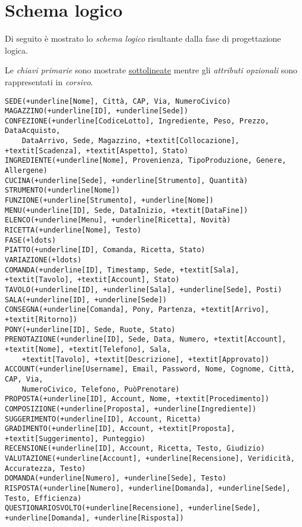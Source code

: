 \section{Schema logico}
Di seguito è mostrato lo {\it schema logico} risultante dalla fase di progettazione logica.

Le {\it chiavi primarie} sono mostrate \underline{sottolineate} mentre gli {\it attributi opzionali}
sono rappresentati in \textit{corsivo}.

\begin{Verbatim}[commandchars=+\[\]]
SEDE(+underline[Nome], Città, CAP, Via, NumeroCivico)
MAGAZZINO(+underline[ID], +underline[Sede])
CONFEZIONE(+underline[CodiceLotto], Ingrediente, Peso, Prezzo, DataAcquisto,
    DataArrivo, Sede, Magazzino, +textit[Collocazione], +textit[Scadenza], +textit[Aspetto], Stato)
INGREDIENTE(+underline[Nome], Provenienza, TipoProduzione, Genere, Allergene)
CUCINA(+underline[Sede], +underline[Strumento], Quantità)
STRUMENTO(+underline[Nome])
FUNZIONE(+underline[Strumento], +underline[Nome])
MENU(+underline[ID], Sede, DataInizio, +textit[DataFine])
ELENCO(+underline[Menu], +underline[Ricetta], Novità)
RICETTA(+underline[Nome], Testo)
FASE(+ldots)
PIATTO(+underline[ID], Comanda, Ricetta, Stato)
VARIAZIONE(+ldots)
COMANDA(+underline[ID], Timestamp, Sede, +textit[Sala], +textit[Tavolo], +textit[Account], Stato)
TAVOLO(+underline[ID], +underline[Sala], +underline[Sede], Posti)
SALA(+underline[ID], +underline[Sede])
CONSEGNA(+underline[Comanda], Pony, Partenza, +textit[Arrivo], +textit[Ritorno])
PONY(+underline[ID], Sede, Ruote, Stato)
PRENOTAZIONE(+underline[ID], Sede, Data, Numero, +textit[Account], +textit[Nome], +textit[Telefono], Sala,
    +textit[Tavolo], +textit[Descrizione], +textit[Approvato])
ACCOUNT(+underline[Username], Email, Password, Nome, Cognome, Città, CAP, Via,
    NumeroCivico, Telefono, PuòPrenotare)
PROPOSTA(+underline[ID], Account, Nome, +textit[Procedimento])
COMPOSIZIONE(+underline[Proposta], +underline[Ingrediente])
SUGGERIMENTO(+underline[ID], Account, Ricetta)
GRADIMENTO(+underline[ID], Account, +textit[Proposta], +textit[Suggerimento], Punteggio)
RECENSIONE(+underline[ID], Account, Ricetta, Testo, Giudizio)
VALUTAZIONE(+underline[Account], +underline[Recensione], Veridicità, Accuratezza, Testo)
DOMANDA(+underline[Numero], +underline[Sede], Testo)
RISPOSTA(+underline[Numero], +underline[Domanda], +underline[Sede], Testo, Efficienza)
QUESTIONARIOSVOLTO(+underline[Recensione], +underline[Sede], +underline[Domanda], +underline[Risposta])
\end{Verbatim}
